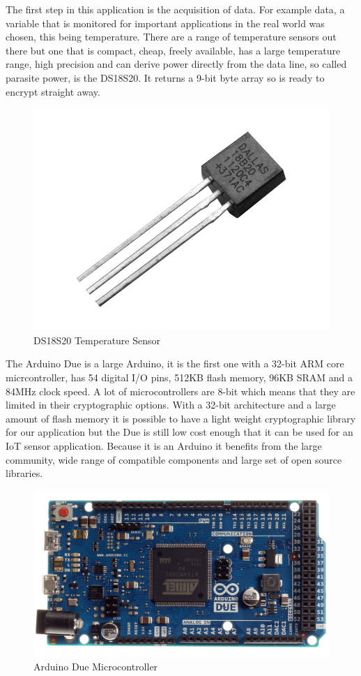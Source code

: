 The first step in this application is the acquisition of data. For example data, a variable that is monitored for important applications in the real world was chosen, this being temperature. There are a range of temperature sensors out there but one that is compact, cheap, freely available, has a large temperature range, high precision and can derive power directly from the data line, so called parasite power, is the DS18S20. It returns a 9-bit byte array so is ready to encrypt straight away. 

\begin{figure}[H]
	\centering
	\includegraphics[width=.4\linewidth]{Figures/ds.jpg}
	\caption{DS18S20 Temperature Sensor}
	\label{fig:ds}
\end{figure}

The Arduino Due is a large Arduino, it is the first one with a 32-bit ARM core micrcontroller, has 54 digital I/O pins, 512KB flash memory, 96KB SRAM and a 84MHz clock speed. A lot of microcontrollers are 8-bit which means that they are limited in their cryptographic options. With a 32-bit architecture and a large amount of flash memory it is possible to have a light weight cryptographic library for our application but the Due is still low cost enough that it can be used for an IoT sensor application. Because it is an Arduino it benefits from the large community, wide range of compatible components and large set of open source libraries.

\begin{figure}[H]
	\centering
	\includegraphics[width=.4\linewidth]{Figures/due.jpg}
	\caption{Arduino Due Microcontroller}
	\label{fig:due}
\end{figure}

